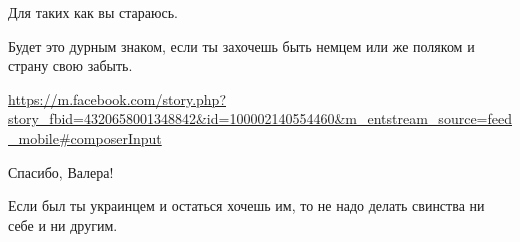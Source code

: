 \begin{itemize}
\begin{itemize}
Для таких как вы стараюсь.

\end{itemize}

 
Будет это дурным знаком, если ты захочешь быть немцем или же поляком и страну
свою забыть.

\begin{itemize}
 
\url{https://m.facebook.com/story.php?story_fbid=4320658001348842&id=100002140554460&m_entstream_source=feed_mobile#composerInput}

 
Спасибо, Валера!
\end{itemize}

 
Если был ты украинцем и остаться хочешь им, то не надо делать свинства ни себе и ни другим.

 


\end{itemize}

